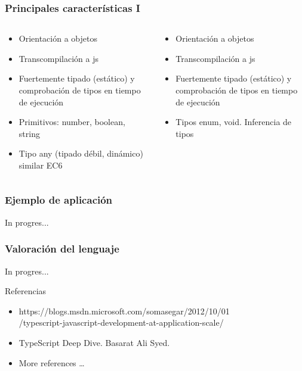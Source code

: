 \documentclass{beamer}
\begin{document}
\begin{frame}
\frametitle{Principales características I}

\small
\begin{columns}[T]
	\begin{column}[T]{.5\textwidth} %
		
		\begin{itemize}
			\item Orientación a objetos
			\item Transcompilación a js 
			\item Fuertemente tipado (estático) y comprobación de tipos en tiempo de ejecución
			\item Primitivos: number, boolean, string
			\item Tipo any (tipado débil, dinámico) similar EC6
		\end{itemize}
		
		
	\end{column}
	\begin{column}[T]{0.5\textwidth} %
		\begin{itemize}
			\item Orientación a objetos
			\item Transcompilación a js 
			\item Fuertemente tipado (estático) y comprobación de tipos en tiempo de ejecución
			\item Tipos enum, void. Inferencia de tipos
		\end{itemize}
		
	\end{column}
\end{columns}


\end{frame}

\begin{frame}
\frametitle{Ejemplo de aplicación}
In progres...
\end{frame}

\begin{frame}
\frametitle{Valoración del lenguaje}
In progres...
\end{frame}

\begin{frame}{Referencias}
\begin{itemize}  
	\item https://blogs.msdn.microsoft.com/somasegar/2012/10/01 \\ /typescript-javascript-development-at-application-scale/
	\item TypeScript Deep Dive. Basarat Ali Syed. 
	\item More references \ldots 
\end{itemize}
\end{frame}
\end{document}
